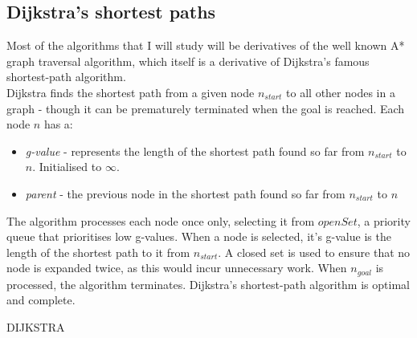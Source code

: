 \documentclass[12pt,twoside,notitlepage]{report}
\begin{document}
\subsection {Dijkstra's shortest paths}

Most of the algorithms that I will study will be derivatives of the well known A* graph traversal algorithm, which itself is a derivative of Dijkstra's famous shortest-path algorithm.\\

\noindent
Dijkstra finds the shortest path from a given node {$n_{start}$} to all other nodes in a graph - though it can be prematurely terminated when the goal is reached. Each node {$n$} has a:
\begin{itemize}
\item {\em g-value} - represents the length of the shortest path found so far from {$n_{start}$} to {$n$}. Initialised to $\infty$.
\item {\em parent} - the previous node in the shortest path found so far from {$n_{start}$} to {$n$}
\end{itemize}
The algorithm processes each node once only, selecting it from $openSet$, a priority queue that prioritises low g-values. When a node is selected, it's g-value is the length of the shortest path to it from {$n_{start}$}. A closed set is used to ensure that no node is expanded twice, as this would incur unnecessary work. When {$n_{goal}$} is processed, the algorithm terminates. Dijkstra's shortest-path algorithm is optimal and complete.\\

\begin{algorithm}[htp]
  \SetAlgoLined\DontPrintSemicolon
  \setcounter{AlgoLine}{0}
  \caption{{\sc DIJKSTRA}}
\end{algorithm} 
\end{document}
